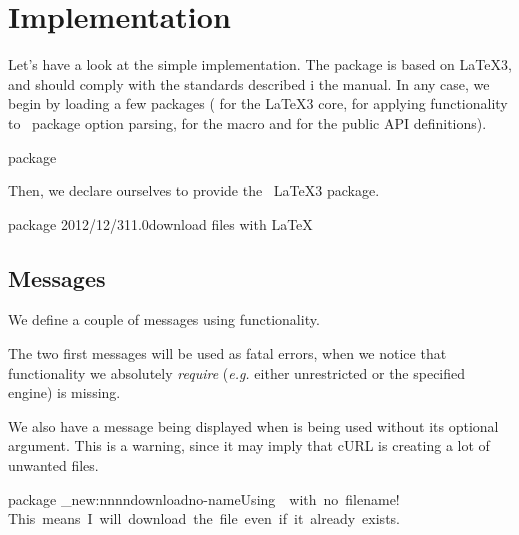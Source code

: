 \documentclass{skdoc}
\begin{document}
    \Implementation
    \SelfPreambleTo{\mypreamble}
    \section{Implementation}
    Let's have a look at the simple implementation. The package is based
    on \LaTeX3, and should comply with the standards described i the
     manual. In any case, we begin by loading a few packages
    ( for the \LaTeX3 core,  for applying
     functionality to \LaTeXe\ package option parsing,
     for the  macro and 
    for the public API definitions).
\begin{MacroCode}{package}
\RequirePackage{expl3,l3keys2e,pdftexcmds,xparse}
\end{MacroCode}
    
    Then, we declare ourselves to provide the \thepkg\ \LaTeX3 package.
\begin{MacroCode}{package}
    {2012/12/31}{1.0}{download files with LaTeX}
\end{MacroCode}

    \subsection{Messages}
    We define a couple of messages using  functionality.

    The two first messages will be used as fatal errors, when we notice
    that functionality we absolutely \emph{require} (\emph{e.g.} either
    unrestricted  or the specified engine) is missing.
    
    We also have a message being displayed when  is being
    used without its optional argument. This is a warning, since it may
    imply that cURL is creating a lot of unwanted files.
\begin{MacroCode}{package}
\msg_new:nnnn{download}{no-name}{Using~\string\download\space~with~no~filename!}
    {This~means~I~will~download~the~file~even~if~it~already~exists.}
\end{MacroCode}
    
\end{document}
